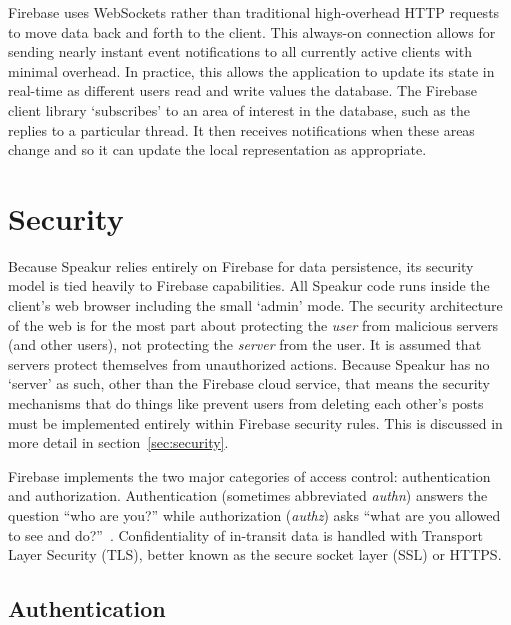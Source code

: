 Firebase uses WebSockets rather than traditional high-overhead HTTP requests to move data back and forth to the client.
This always-on connection allows for sending nearly instant event notifications to all currently active clients with minimal overhead.
In practice, this allows the application to update its state in real-time as different users read and write values the database.
The Firebase client library `subscribes' to an area of interest in the database, such as the replies to a particular thread.
It then receives notifications when these areas change and so it can update the local representation as appropriate.

\section{Security}
\label{sec:arch_security}
Because Speakur relies entirely on Firebase for data persistence, its security model is tied heavily to Firebase capabilities. 
All Speakur code runs inside the client's web browser including the small `admin' mode.
The security architecture of the web is for the most part about protecting the \textit{user} from malicious servers (and other users), not protecting the \textit{server} from the user.
It is assumed that servers protect themselves from unauthorized actions.
Because Speakur has no `server' as such, 
other than the Firebase cloud service,
that means the security mechanisms that do things like prevent users from deleting each other's posts 
must be implemented entirely within Firebase security rules.
This is discussed in more detail in section~\ref{sec:security}.

Firebase implements the two major categories of access control: authentication and 
authorization. 
Authentication (sometimes abbreviated \textit{authn}) answers the question ``who are you?'' 
while authorization (\textit{authz}) asks ``what are you allowed to see and do?''~\cite{stallings2011}.
Confidentiality of in-transit data is handled with Transport Layer Security (TLS), 
better known as the secure socket layer (SSL) or HTTPS.


\subsection{Authentication}

